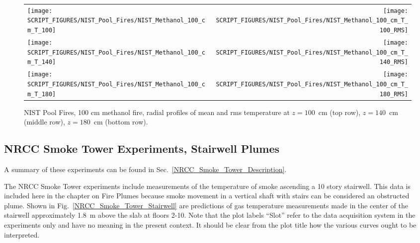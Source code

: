 \begin{figure}[p]
\begin{tabular*}{\textwidth}{l@{\extracolsep{\fill}}r}
\texttt{[image: SCRIPT\_FIGURES/NIST\_Pool\_Fires/NIST\_Methanol\_100\_cm\_T\_100]} &
\texttt{[image: SCRIPT\_FIGURES/NIST\_Pool\_Fires/NIST\_Methanol\_100\_cm\_T\_100\_RMS]} \\
\texttt{[image: SCRIPT\_FIGURES/NIST\_Pool\_Fires/NIST\_Methanol\_100\_cm\_T\_140]} &
\texttt{[image: SCRIPT\_FIGURES/NIST\_Pool\_Fires/NIST\_Methanol\_100\_cm\_T\_140\_RMS]} \\
\texttt{[image: SCRIPT\_FIGURES/NIST\_Pool\_Fires/NIST\_Methanol\_100\_cm\_T\_180]} &
\texttt{[image: SCRIPT\_FIGURES/NIST\_Pool\_Fires/NIST\_Methanol\_100\_cm\_T\_180\_RMS]}
\end{tabular*}
\caption[NIST Pool Fires, 100 cm methanol fire, radial profiles of mean and rms temperature]
{NIST Pool Fires, 100 cm methanol fire, radial profiles of mean and rms temperature at $z=100$~cm (top row), $z=140$~cm (middle row), $z=180$~cm (bottom row).}
\label{NIST_Pool_Fires_Plume_Temps_2}
\end{figure}


\clearpage

\subsection{NRCC Smoke Tower Experiments, Stairwell Plumes}
\label{NRCC_Smoke_Tower_Plume_Temperature}

A summary of these experiments can be found in Sec.~\ref{NRCC_Smoke_Tower_Description}.

The NRCC Smoke Tower experiments include measurements of the temperature of smoke ascending a 10 story stairwell. This data is included here in the chapter on Fire Plumes because smoke movement in a vertical shaft with stairs can be considered an obstructed plume. Shown in Fig.~\ref{NRCC_Smoke_Tower_Stairwell} are predictions of gas temperature measurements made in the center of the stairwell approximately 1.8~m above the slab at floors 2-10. Note that the plot labels ``Slot'' refer to the data acquisition system in the experiments only and have no meaning in the present context. It should be clear from the plot title how the various curves ought to be interpreted.

\newpage

